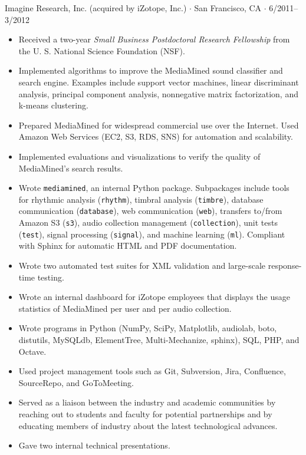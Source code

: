 \documentclass[10pt,letterpaper]{article}
\begin{document}
Imagine Research, Inc. (acquired by iZotope, Inc.) $\cdot$ San Francisco, CA $\cdot$ 6/2011--3/2012
\begin{itemize}
    \item Received a two-year \textit{Small Business Postdoctoral Research Fellowship} from the U. S. National Science Foundation (NSF).
    \item Implemented algorithms to improve the MediaMined sound classifier and search engine. Examples include support vector machines, linear discriminant analysis, principal component analysis, nonnegative matrix factorization, and k-means clustering.
    \item Prepared MediaMined for widespread commercial use over the Internet. Used Amazon Web Services (EC2, S3, RDS, SNS) for automation and scalability.
    \item Implemented evaluations and visualizations to verify the quality of MediaMined's search results.
    \item Wrote \texttt{mediamined}, an internal Python package. Subpackages include tools for rhythmic analysis (\texttt{rhythm}), timbral analysis (\texttt{timbre}), database communication (\texttt{database}), web communication (\texttt{web}), transfers to/from Amazon S3 (\texttt{s3}), audio collection management (\texttt{collection}), unit tests (\texttt{test}), signal processing (\texttt{signal}), and machine learning (\texttt{ml}). Compliant with Sphinx for automatic HTML and PDF documentation.
    \item Wrote two automated test suites for XML validation and large-scale response-time testing.
    \item Wrote an internal dashboard for iZotope employees that displays the usage statistics of MediaMined per user and per audio collection.
    \item Wrote programs in Python (NumPy, SciPy, Matplotlib, audiolab, boto, distutils, MySQLdb, ElementTree, Multi-Mechanize, sphinx), SQL, PHP, and Octave.
    \item Used project management tools such as Git, Subversion, Jira, Confluence, SourceRepo, and GoToMeeting.
    \item Served as a liaison between the industry and academic communities by reaching out to students and faculty for potential partnerships and by educating members of industry about the latest technological advances.
    \item Gave two internal technical presentations.
\end{itemize}
\end{document}
